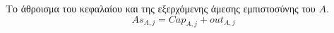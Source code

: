 {}
\begin{definition}[Περιουσία]
  Το άθροισμα του κεφαλαίου και της εξερχόμενης άμεσης εμπιστοσύνης του $A$.
  \begin{equation}
    As_{A, j} = Cap_{A, j} + out_{A, j}
  \end{equation}
\end{definition}
